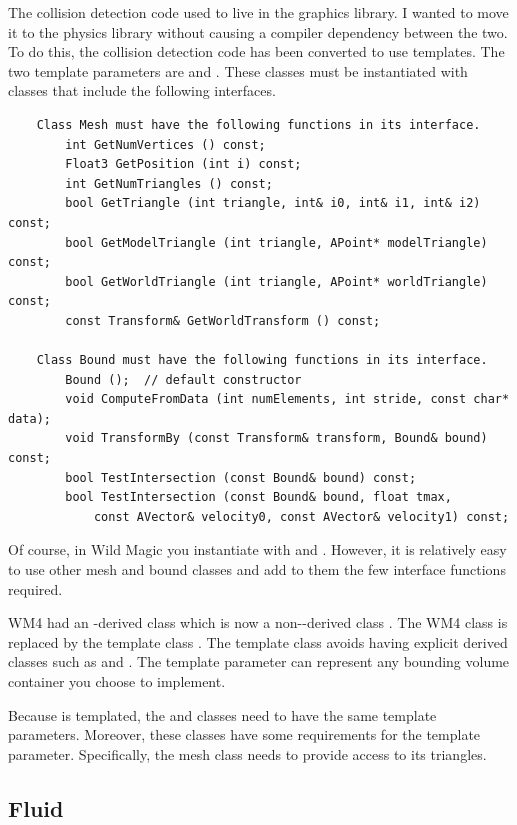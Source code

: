 \documentclass{article}
\begin{document}
The collision detection code used to live in the graphics library.  I wanted
to move it to the physics library without causing a compiler dependency
between the two.  To do this, the collision detection code has been converted
to use templates.  The two template parameters are  and
.  These classes must be instantiated with classes that include
the following interfaces.
\begin{verbatim}
    Class Mesh must have the following functions in its interface.
        int GetNumVertices () const;
        Float3 GetPosition (int i) const;
        int GetNumTriangles () const;
        bool GetTriangle (int triangle, int& i0, int& i1, int& i2) const;
        bool GetModelTriangle (int triangle, APoint* modelTriangle) const;
        bool GetWorldTriangle (int triangle, APoint* worldTriangle) const;
        const Transform& GetWorldTransform () const;

    Class Bound must have the following functions in its interface.
        Bound ();  // default constructor
        void ComputeFromData (int numElements, int stride, const char* data);
        void TransformBy (const Transform& transform, Bound& bound) const;
        bool TestIntersection (const Bound& bound) const;
        bool TestIntersection (const Bound& bound, float tmax,
            const AVector& velocity0, const AVector& velocity1) const;
\end{verbatim}
Of course, in Wild Magic you instantiate with  and .
However, it is relatively easy to use other mesh and bound classes and add to
them the few interface functions required.

WM4 had an -derived class  which is now
a non--derived class .  The WM4 class
 is replaced by the template class .
The template class avoids having explicit derived classes such as
 and .  The  template
parameter can represent any bounding volume container you choose to
implement.

Because  is templated, the  and
 classes need to have the same template parameters.
Moreover, these classes have some requirements for the  template
parameter.  Specifically, the mesh class needs to provide access to its
triangles.

\subsection{Fluid}
\end{document}
